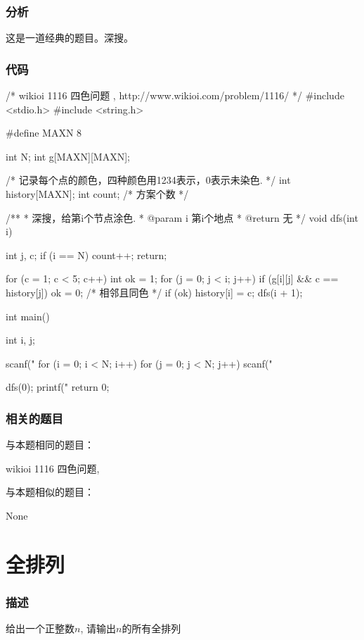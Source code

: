 \subsubsection{分析}
这是一道经典的题目。深搜。

\subsubsection{代码}
\begin{Codex}[label=four_colors.c]
/* wikioi 1116 四色问题   , http://www.wikioi.com/problem/1116/ */
#include <stdio.h>
#include <string.h>

#define MAXN 8

int N;
int g[MAXN][MAXN];

/* 记录每个点的颜色，四种颜色用1234表示，0表示未染色. */
int history[MAXN];
int count; /* 方案个数 */

/**
 * 深搜，给第i个节点涂色.
 * @param i 第i个地点
 * @return 无
 */
void dfs(int i) {
    int j, c;
    if (i == N) {
        count++;
        return;
    }

    for (c = 1; c < 5; c++) {
        int ok = 1;
        for (j = 0; j < i; j++) {
            if (g[i][j] && c == history[j])
                ok = 0; /* 相邻且同色 */
        }
        if (ok) {
            history[i] = c;
            dfs(i + 1);
        }
    }
}

int main() {
    int i, j;

    scanf("%
    for (i = 0; i < N; i++) {
        for (j = 0; j < N; j++) {
            scanf("%
        }
    }

    dfs(0);
    printf("%
    return 0;
}
\end{Codex}

\subsubsection{相关的题目}
与本题相同的题目：
\begindot
\item wikioi 1116 四色问题, 
\myenddot

与本题相似的题目：
\begindot
\item None
\myenddot


\section{全排列} %

\subsubsection{描述}
给出一个正整数$n$, 请输出$n$的所有全排列

